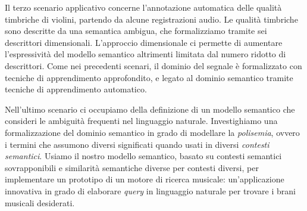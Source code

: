 Il terzo scenario applicativo concerne l'annotazione automatica delle qualit\`a timbriche di violini, partendo da alcune registrazioni audio. Le qualit\`a timbriche sono descritte da una semantica ambigua, che formalizziamo tramite sei descrittori dimensionali. L'approccio dimensionale ci permette di aumentare l'espressivit\`a del modello semantico altrimenti limitata dal numero ridotto di descrittori. Come nei precedenti scenari, il dominio del segnale \`e formalizzato con tecniche di apprendimento approfondito, e legato al dominio semantico tramite tecniche di apprendimento automatico.

Nell'ultimo scenario ci occupiamo della definizione di un modello semantico che consideri le ambiguit\`a frequenti nel linguaggio naturale. Investighiamo una formalizzazione del dominio semantico in grado di modellare la \textit{polisemia}, ovvero i termini che assumono diversi significati quando usati in diversi \textit{contesti semantici}. Usiamo il nostro modello semantico, basato su contesti semantici sovrapponibili e similarit\`a semantiche diverse per contesti diversi, per implementare un prototipo di un motore di ricerca musicale: un'applicazione innovativa in grado di elaborare \textit{query} in linguaggio naturale per trovare i brani musicali desiderati.

